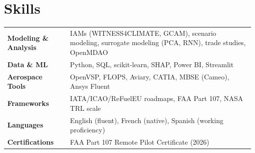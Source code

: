 \documentclass[a4paper,10pt]{article}
\begin{document}
\section*{Skills}
\begin{tabularx}{\linewidth}{@{}l X@{}}
\textbf{Modeling \& Analysis}  & IAMs (WITNESS4CLIMATE, GCAM), scenario modeling, surrogate modeling (PCA, RNN), trade studies, OpenMDAO \\
\textbf{Data \& ML}            & Python, SQL, scikit-learn, SHAP, Power BI, Streamlit \\
\textbf{Aerospace Tools}       & OpenVSP, FLOPS, Aviary, CATIA, MBSE (Cameo), Ansys Fluent \\
\textbf{Frameworks}            & IATA/ICAO/ReFuelEU roadmaps, FAA Part 107, NASA TRL scale \\
\textbf{Languages}             & English (fluent), French (native), Spanish (working proficiency) \\
\textbf{Certifications}        & FAA Part 107 Remote Pilot Certificate (2026) \\
\end{tabularx}
\end{document}
